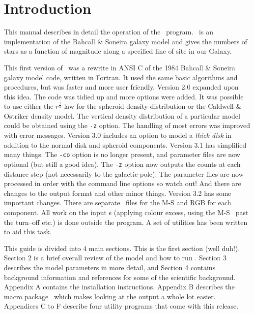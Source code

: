\documentclass[11pt,twoside]{article}
\begin{document}
\newpage
\setcounter{page}{1}
\section{Introduction}


This manual describes in detail the operation of the \bsm\ program. \bsm\
is an implementation of the Bahcall \& Soneira galaxy model and gives the
numbers of stars as a function of magnitude along a specified line of site
in our Galaxy.

This first version of \bsm\ was a rewrite in ANSI C of the 1984 
Bahcall \& Soneira galaxy model code, written in Fortran.
It used the same basic algorithms and procedures, but was faster and more 
user friendly. Version 2.0 expanded upon this idea. The code was tidied
up and more options were added. It was possible to use either the 
$r^{\frac{1}{4}}$ law for the spheroid density distribution or the 
Caldwell \& Ostriker density model. The vertical density distribution of 
a particular model could be obtained using the {\tt -z} option. 
The handling of most errors was improved with error messages. 
Version 3.0 includes an option to model a {\em thick disk} in addition
to the normal disk and spheroid components. Version 3.1 has simplified many 
things. The {\tt -co} option is no longer present, and parameter files are 
now optional (but still a good idea). The {\tt -z} option now outputs the 
counts at each distance step (not necessarily to the galactic pole). The 
parameter files are now processed in order with the command line options so 
watch out! And there are changes to the output format and other minor things.
Version 3.2 has some important changes. There are separate \cmd\ files for 
the M-S and RGB for each component. All work on the input \cmd s (applying
colour excess, using the M-S \cmd\ past the turn--off etc.) is done outside
the program. A set of utilities has been written to aid this task.

This guide is divided into 4 main sections.  This is the first section (well
duh!). Section 2 is a brief overall review of the model and how
to run \bsm. Section 3 describes the model parameters in more detail, and
Section 4 contains background information and references for some of the
scientific background. Appendix A contains the installation instructions.
Appendix B describes the macro package \bsmsm\ which makes looking at the
output a whole lot easier. Appendices C to F describe four utility programs 
that come with this release.
\end{document}
